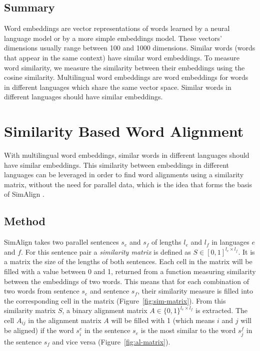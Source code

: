 \subsection{Summary}
Word embeddings are vector representations of words learned by a neural language model or by a more simple embeddings model. 
These vectors' dimensions usually range between 100 and 1000 dimensions. 
Similar words (words that appear in the same context) have similar word embeddings. 
To measure word similarity, we measure the similarity between their embeddings using the cosine similarity.
Multilingual word embeddings are word embeddings for words in different languages which share the same vector space. 
Similar words in different languages should have similar embeddings.

\section{Similarity Based Word Alignment}



With multilingual word embeddings, similar words in different languages should have similar embeddings. 
This similarity between embeddings in different languages can be leveraged in order to find word alignments using a similarity matrix, without the need for parallel data, which is the idea that forms the basis of SimAlign \autocite{jalili-sabet-etal-2020-simalign}.

\subsection{Method}
\label{subsec:simalign-method}
SimAlign takes two parallel sentences $s_e$ and $s_f$ of lengths $l_e$ and $l_f$ in languages $e$ and $f$. 
For this sentence pair a \emph{similarity matrix} is defined as $S \in [0,1]^{l_e\times l_f}$. 
It is a matrix the size of the lengths of both sentences. Each cell in the matrix will be filled with a value between 0 and 1, returned from a function measuring similarity between the embeddings of two words. 
This means that for each combination of two words from sentence $s_e$ and sentence $s_f$, their similarity measure is filled into the corresponding cell in the matrix (Figure~\ref{fig:sim-matrix}).
From this similarity matrix $S$, a binary alignment matrix $A \in \{0,1\}^{l_e \times l_f}$ is extracted. 
The cell $A_{ij}$ in the alignment matrix $A$ will be filled with 1 (which means $i$ and $j$ will be aligned) if the word $s_i^e$ in the sentence $s_e$ is the most similar to the word $s_j^f$ in the sentence $s_f$ and vice versa (Figure~\ref{fig:al-matrix}).



